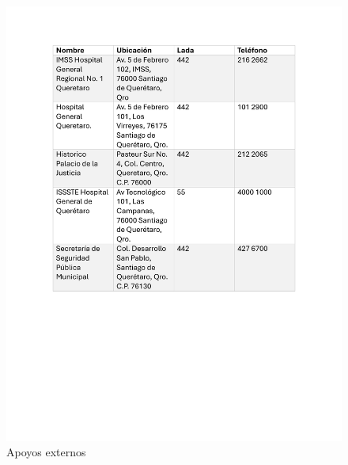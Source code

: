\begin{figure}[H]
    \centering
    \includegraphics[scale=0.25]{13/img/apoyosExternos.pdf}
    \caption{Apoyos externos}
    \label{fig:Apoyos externos}
\end{figure}
% 
% 
% 
